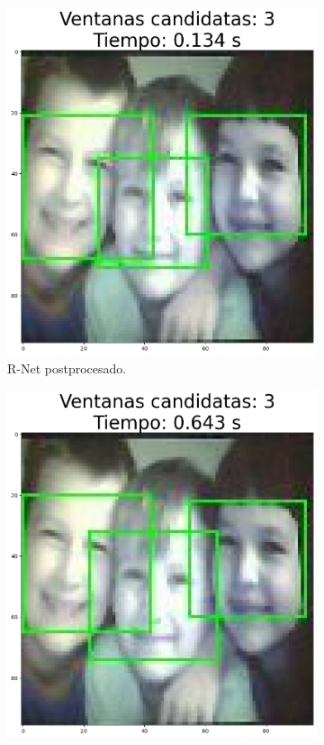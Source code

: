 \begin{figure}[!htpb]
\begin{subfigure}[b]{0.28\textwidth}
         \includegraphics[width=\textwidth]{./Figures/rnet.png}
         \caption{R-Net postprocesado.}
         \label{fig:2de3}
     \end{subfigure}
     \hfill
	 \begin{subfigure}[b]{0.28\textwidth}
         \centering
         \includegraphics[width=\textwidth]{./Figures/onet.png}

\end{subfigure}
\end{figure}
